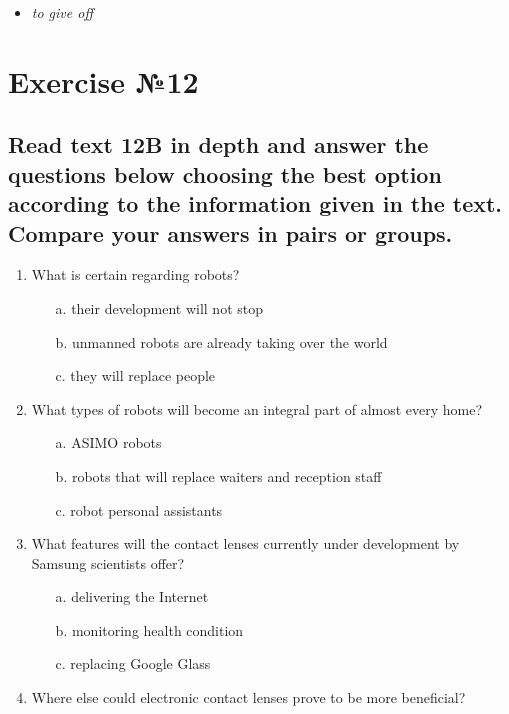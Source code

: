 \begin{itemize}
      \item \textit{to give off}
\end{itemize}

\section{Exercise №12}
\subsection*{Read text 12B in depth and answer the questions below choosing the best option according
      to the information given in the text. Compare your answers in pairs or groups.}

\begin{enumerate}
      \item What is certain regarding robots?
            \begin{enumerate}
                  \item[a.] their development will not stop
                  \item[b.] unmanned robots are already taking over the world
                  \item[c.] they will replace people
            \end{enumerate}
      \item What types of robots will become an integral part of almost every home?
            \begin{enumerate}
                  \item[a.] ASIMO robots
                  \item[b.] robots that will replace waiters and reception staff
                  \item[c.] robot personal assistants
            \end{enumerate}
      \item What features will the contact lenses currently under development by Samsung scientists offer?
            \begin{enumerate}
                  \item[a.] delivering the Internet
                  \item[b.] monitoring health condition
                  \item[c.] replacing Google Glass
            \end{enumerate}
      \item Where else could electronic contact lenses prove to be more beneficial?

\end{enumerate}
